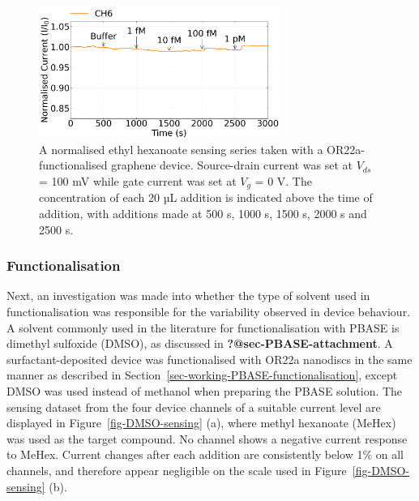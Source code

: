 \documentclass[
  a4paper,
]{scrbook}
\begin{document}
\begin{figure}

{\centering \includegraphics[width=0.7\textwidth,height=\textheight]{figures/ch8/Q3C3_filtered_trunc_arrows_normalised.png}

}

\caption{\label{fig-graphene-sensing}A normalised ethyl hexanoate
sensing series taken with a OR22a-functionalised graphene device.
Source-drain current was set at \(V_{ds}\) = 100 mV while gate current
was set at \(V_g\) = 0 V. The concentration of each 20 µL addition is
indicated above the time of addition, with additions made at 500 s, 1000
s, 1500 s, 2000 s and 2500 s.}

\end{figure}

\hypertarget{functionalisation}{%
\subsubsection*{Functionalisation}\label{functionalisation}}

Next, an investigation was made into whether the type of solvent used in
functionalisation was responsible for the variability observed in device
behaviour. A solvent commonly used in the literature for
functionalisation with PBASE is dimethyl sulfoxide (DMSO), as discussed
in \textbf{?@sec-PBASE-attachment}. A surfactant-deposited device was
functionalised with OR22a nanodiscs in the same manner as described in
Section~\ref{sec-working-PBASE-functionalisation}, except DMSO was used
instead of methanol when preparing the PBASE solution. The sensing
dataset from the four device channels of a suitable current level are
displayed in Figure~\ref{fig-DMSO-sensing} (a), where methyl hexanoate
(MeHex) was used as the target compound. No channel shows a negative
current response to MeHex. Current changes after each addition are
consistently below 1\% on all channels, and therefore appear negligible
on the scale used in Figure~\ref{fig-DMSO-sensing} (b).
\end{document}
